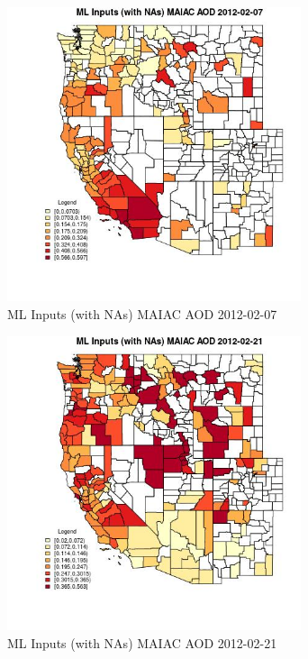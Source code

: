 \begin{figure} 
\centering  
\includegraphics[width=0.77\textwidth]{Code_Outputs/Report_ML_input_PM25_Step4_part_f_de_duplicated_aveswNAs_CountyMAIAC_AODMean2012-02-07.jpg} 
\caption{\label{fig:Report_ML_input_PM25_Step4_part_f_de_duplicated_aveswNAsCountyMAIAC_AODMean2012-02-07}ML Inputs (with NAs) MAIAC AOD 2012-02-07} 
\end{figure} 
 

\begin{figure} 
\centering  
\includegraphics[width=0.77\textwidth]{Code_Outputs/Report_ML_input_PM25_Step4_part_f_de_duplicated_aveswNAs_CountyMAIAC_AODMean2012-02-21.jpg} 
\caption{\label{fig:Report_ML_input_PM25_Step4_part_f_de_duplicated_aveswNAsCountyMAIAC_AODMean2012-02-21}ML Inputs (with NAs) MAIAC AOD 2012-02-21} 
\end{figure} 
 

